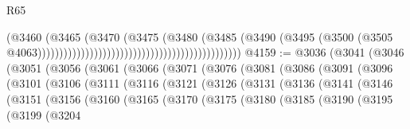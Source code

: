 \begin{lexlean}{R65}
\begin{coremodule}
{                                                                              (@3460
                                                                                (@3465
                                                                                  (@3470
                                                                                    (@3475
                                                                                      (@3480
                                                                                        (@3485
                                                                                          (@3490
                                                                                            (@3495
                                                                                              (@3500
                                                                                                (@3505
                                                                                                  @4063)))))))))))))))))))))))))))))))))))))))))))))))
@4159 := @3036
    (@3041
      (@3046
        (@3051
          (@3056
            (@3061
              (@3066
                (@3071
                  (@3076
                    (@3081
                      (@3086
                        (@3091
                          (@3096
                            (@3101
                              (@3106
                                (@3111
                                  (@3116
                                    (@3121
                                      (@3126
                                        (@3131
                                          (@3136
                                            (@3141
                                              (@3146
                                                (@3151
                                                  (@3156
                                                    (@3160
                                                      (@3165
                                                        (@3170
                                                          (@3175
                                                            (@3180
                                                              (@3185
                                                                (@3190
                                                                  (@3195
                                                                    (@3199
                                                                      (@3204
}
\end{coremodule}
\end{lexlean}
